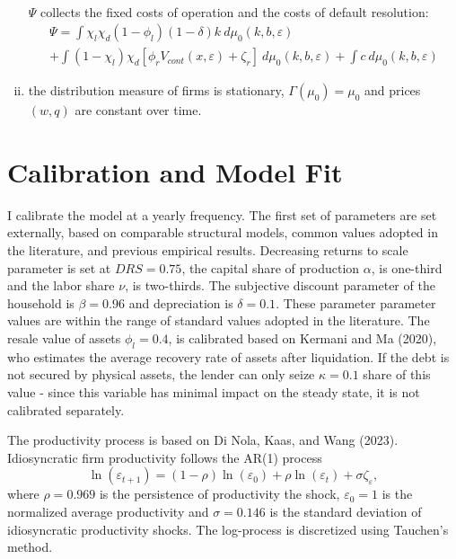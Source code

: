 \documentclass[12pt]{article}
\begin{document}
\begin{enumerate}[(i)]
\begin{multline*}
\end{multline*}
$\Psi$ collects the fixed costs of operation and the costs of default resolution:
\begin{multline*} 
    \Psi = \int  \chi_l \chi_d (1-\phi_l) (1-\delta)k \ d \mu_0 (k,b,\varepsilon)  \\ + \int  (1 - \chi_l)  \chi_d [\phi_r V_{cont}(x, \varepsilon) + \zeta_r] \ d \mu_0 (k,b,\varepsilon) + \int  c \ d \mu_0 (k,b,\varepsilon) 
\end{multline*}
\item the distribution measure of firms is stationary, $\Gamma(\mu_0) = \mu_0$ and prices $(w,q)$ are constant over time.
\end{enumerate}


\section{Calibration and Model Fit}
I calibrate the model at a yearly frequency. The first set of parameters are set externally, based on comparable structural models, common values adopted in the literature, and previous empirical results. Decreasing returns to scale parameter is set at $DRS = 0.75$, the capital share of production $\alpha$, is one-third and the labor share $\nu$, is two-thirds. The subjective discount parameter of the household is $\beta = 0.96$ and depreciation is $\delta = 0.1$. These parameter parameter values are within the range of standard values adopted in the literature. The resale value of assets $\phi_l = 0.4$, is calibrated based on Kermani and Ma (2020), who estimates the average recovery rate of assets after liquidation. If the debt is not secured by physical assets, the lender can only seize $\kappa = 0.1$ share of this value - since this variable has minimal impact on the steady state, it is not calibrated separately. 

The productivity process is based on Di Nola, Kaas, and Wang (2023). Idiosyncratic firm productivity follows the AR(1) process 
$$ \ln(\varepsilon_{t+1}) = (1-\rho) \ln(\varepsilon_0) + \rho \ln(\varepsilon_t) + \sigma \zeta_\varepsilon, $$ where 
$\rho = 0.969$ is the persistence of productivity the shock, $\varepsilon_0 = 1$ is the normalized average productivity and $\sigma = 0.146$ is the standard deviation of idiosyncratic productivity shocks. The log-process is discretized using Tauchen's method. 
\end{document}
